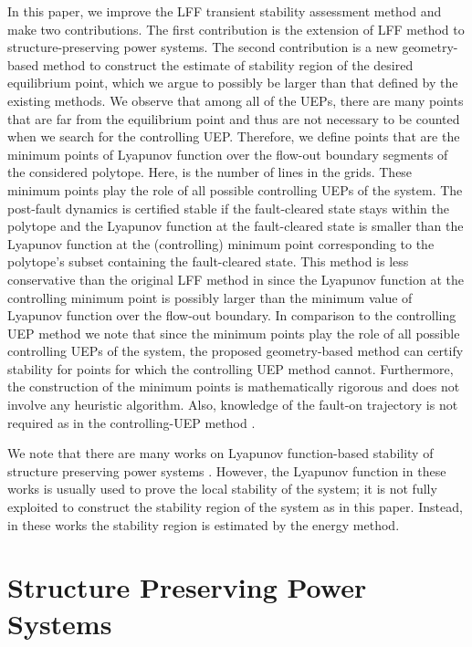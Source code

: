 \documentclass[final]{IEEEtran}
\begin{document}
In this paper, we improve the LFF transient stability assessment method and make two contributions. The first contribution is the extension of
LFF method to structure-preserving power systems. The second contribution is a new geometry-based method
to construct the estimate of stability region of the desired equilibrium point, which we argue to possibly be larger than that defined by the existing methods. We observe that among all of the UEPs, there are many points that are far from the equilibrium point and thus are not necessary to be counted when we search for the controlling UEP. Therefore, we define  points that are the minimum points of Lyapunov function over the  flow-out boundary segments of the considered polytope. Here,  is the number of lines in the grids. These  minimum points play the role of all possible controlling UEPs of the system. The post-fault dynamics is certified stable
if the fault-cleared state stays within the polytope and the Lyapunov function at the fault-cleared state is smaller than the Lyapunov function at the (controlling) minimum point corresponding to the polytope's subset containing the fault-cleared state. This method is less conservative than the original LFF method in \cite{Vu:2014} since the Lyapunov function at the controlling minimum point is possibly larger than the minimum value of Lyapunov function over the flow-out boundary. In comparison to the controlling UEP method we note that since the  minimum points play the role of all possible controlling UEPs of the system, the proposed geometry-based method can certify stability for points for which the controlling UEP method cannot. Furthermore, the construction of the minimum points is mathematically rigorous and does not involve any heuristic algorithm. Also, knowledge of the fault-on trajectory is not required as in the controlling-UEP method \cite{Zou:2003ji}.     


We note that there are many works on Lyapunov function-based stability of structure preserving power systems
\cite{bergen1981structure,Hiskens:1997Lya,hill1989lyapunov}. However, the Lyapunov function in these works is usually used to prove the local stability of the
system; it is not fully exploited to construct the stability region of the system as in this paper. Instead, in these works the stability region is estimated by the energy method.




\section{Structure Preserving Power Systems}
\label{sec:structure-preserving}
\end{document}
